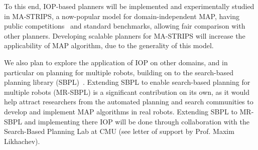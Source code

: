 \documentclass[11pt]{article}
\begin{document}
To this end, IOP-based planners will be implemented and experimentally studied in MA-STRIPS, a now-popular model for domain-independent MAP, having public competitions~\cite{vstolba2015competition} and standard benchmarks, allowing fair comparison with other planners. Developing scalable planners for MA-STRIPS will increase the applicability of MAP algorithm, due to the generality of this model. 

We also plan to explore the application of IOP on other domains, and in particular on planning for multiple robots, building on to the search-based planning library (SBPL)~\cite{likhachev2010sbpl}. Extending SBPL to enable search-based planning for multiple robots (MR-SBPL) is a significant contribution on its own, as it would help attract researchers from the automated planning and search communities to develop and implement MAP algorithms in real robots. Extending SBPL to MR-SBPL and implementing there IOP will be done through collaboration with the Search-Based Planning Lab at CMU (see letter of support by Prof. Maxim Likhachev). 









\end{document}
